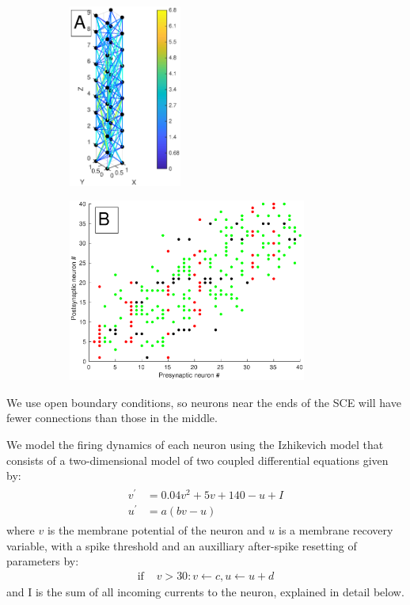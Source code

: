 \documentclass[12pt]{article}
\begin{document}
\begin{figure}[!htb]
 \caption{Example SCE with dimensions 2x2x10 (X/Y/Z), $\lambda$=2.5, and C=1. A) SCE showing connections between neurons as lines colored using a color scale that indicates the connection length. 
 B) Connection matrix. E-E connections are green, E-I are black and both I-E and I-I are red. 
 The labels of the neurons used in both axes are sequentially assigned starting at the bottom (Z=0).}
 \label{fig:column_structure}
 \begin{subfigure}{0.3\textwidth}
   \centering
   \includegraphics[height=60mm]{fig/column_structure_A}
 \end{subfigure}%
 \hfill
 \begin{subfigure}{0.7\textwidth}
   \centering
   \includegraphics[height=60mm]{fig/column_structure_B}
 \end{subfigure}%
 \hfill
\end{figure}
We use open boundary conditions, so neurons near the ends of the SCE will have fewer connections than those in the middle. 

\FloatBarrier

We model the firing dynamics of each neuron using the Izhikevich model \parencite{izhikevich2003} that consists of a two-dimensional model of two coupled differential equations given by:
\begin{align}
 \begin{split}
  v^\prime &= 0.04v^2+5v+140-u+I \label{eq:neuron_v} \\
  u^\prime &= a(bv-u)
 \end{split}
\end{align}
where $v$ is the membrane potential of the neuron and $u$ is a membrane recovery variable, with a spike threshold and an auxilliary after-spike resetting of parameters by:
\begin{align}
  \text{if } &v>30: v\leftarrow c, u\leftarrow u+d
\end{align}
and I is the sum of all incoming currents to the neuron, explained in detail below. 
\end{document}
